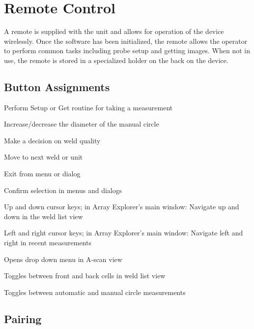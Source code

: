 \chapter[remote-control]{Remote Control}

A remote is supplied with the unit and allows for operation of the device
wirelessly. Once the software has been initialized, the remote allows the
operator to perform common tasks including probe setup and getting images. When
not in use, the remote is stored in a specialized holder on the back on the
device.

\section[button-assignments]{Button Assignments}


Perform Setup or Get routine for taking a measurement
\stopdescription

\startdescription{+ / -}
Increase/decrease the diameter of the manual circle
\stopdescription

Make a decision on weld quality
\stopdescription

Move to next weld or unit
\stopdescription

Exit from menu or dialog
\stopdescription

Confirm selection in menus and dialogs
\stopdescription

Up and down cursor keys; in Array Explorer’s main window: Navigate up and down in the weld list view
\stopdescription

Left and right cursor keys; in Array Explorer’s main window: Navigate left and right in recent measurements
\stopdescription

Opens drop down menu in A-scan view
\stopdescription

Toggles between front and back cells in weld list view
\stopdescription

Toggles between automatic and manual circle measurements
\stopdescription

\section[pairing]{Pairing}

